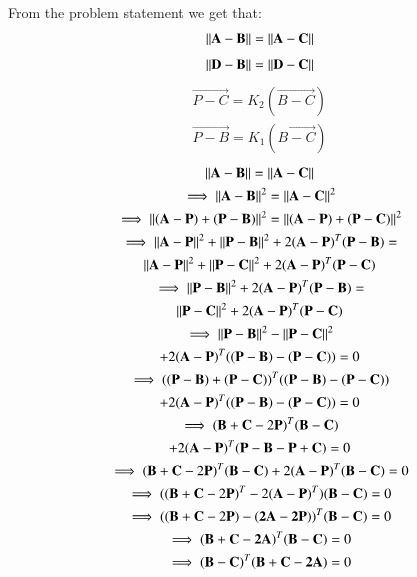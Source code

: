 \documentclass[journal,12pt,twocolumn]{IEEEtran}
\begin{document}
From the problem statement we get that:
\begin{equation}
\begin{aligned}
\left\lVert\mathbf{A}-\mathbf{B}\right\rVert = \left\lVert\mathbf{A}-\mathbf{C}\right\rVert
\end{aligned}
\end{equation}
\label{cond1}
\begin{align}
\left\lVert\mathbf{D}-\mathbf{B}\right\rVert = \left\lVert\mathbf{D}-\mathbf{C}\right\rVert
\end{align}
\label{cond2}
\begin{align}
\vec{P-C} = K_2 (\vec{B-C})\\
\vec{P-B} = K_1 (\vec{B-C})
\end{align}
\begin{multline}
\left\lVert\mathbf{A-B}\right\rVert = \left\lVert\mathbf{A}-\mathbf{C}\right\rVert\\
\implies \left\lVert\mathbf{A-B}\right\rVert^2 = \left\lVert\mathbf{A-C}\right\rVert^2\\
\implies \left\lVert{(\mathbf{A-P}) + (\mathbf{P-B})}\right\rVert^2 = \left\lVert{(\mathbf{A-P}) + (\mathbf{P-C})}\right\rVert^2\\
\implies \left\lVert\mathbf{A-P}\right\rVert^2 + \left\lVert\mathbf{P-B}\right\rVert^2 + 2(\mathbf{A-P})^T (\mathbf{P-B})=\\
\left\lVert\mathbf{A-P}\right\rVert^2 + \left\lVert\mathbf{P-C}\right\rVert^2 + 2(\mathbf{A-P})^T (\mathbf{P-C})\\
\implies \left\lVert\mathbf{P-B}\right\rVert^2 + 2(\mathbf{A-P})^T (\mathbf{P-B})=\\
\left\lVert\mathbf{P-C}\right\rVert^2 + 2(\mathbf{A-P})^T (\mathbf{P-C})\\
\implies \left\lVert\mathbf{P-B}\right\rVert^2 -\left\lVert\mathbf{P-C}\right\rVert^2\\
 + 2(\mathbf{A-P})^T ((\mathbf{P-B})-(\mathbf{P-C})) =0\\
\implies ((\mathbf{P-B})+(\mathbf{P-C}))^T ((\mathbf{P-B})-(\mathbf{P-C}))\\
+ 2(\mathbf{A-P})^T ((\mathbf{P-B})-(\mathbf{P-C})) =0\\
\implies (\mathbf{B}+\mathbf{C}-2\mathbf{P})^T (\mathbf{B-C})\\
+2(\mathbf{A-P})^T (\mathbf{P}-\mathbf{B}-\mathbf{P}+\mathbf{C}) =0\\
\implies (\mathbf{B}+\mathbf{C}-2\mathbf{P})^T (\mathbf{B-C})+2(\mathbf{A-P})^T (\mathbf{B-C}) =0\\
\implies ((\mathbf{B}+\mathbf{C}-2\mathbf{P})^T - 2(\mathbf{A-P})^T)(\mathbf{B-C})=0\\
\implies ((\mathbf{B}+\mathbf{C}-2\mathbf{P})-(\mathbf{2A-2P}))^T (\mathbf{B-C})=0\\
\implies (\mathbf{B+C-2A})^T (\mathbf{B-C})=0\\
\implies (\mathbf{B-C})^T (\mathbf{B+C-2A})=0\\
\label{cond3}
\end{multline}
\end{document}
